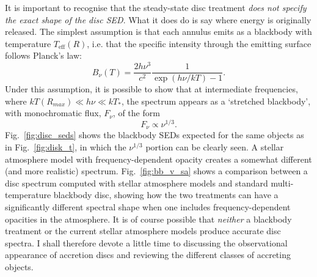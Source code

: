 It is important to recognise that the steady-state disc treatment
{\sl does not specify the exact shape of the disc SED}. What it does do is 
say where energy is originally released. The simplest assumption is
that each annulus emits as a blackbody with temperature 
$T_{\mathrm{eff}} (R)$, i.e. that the specific intensity through the emitting surface
follows Planck's law:
\begin{equation}
B_\nu (T) = \frac{2 h \nu^3}{c^2} \frac{1}{\exp(h\nu / kT) - 1}.
\label{eq:planck}
\end{equation}
Under this assumption, it is possible to show that at intermediate frequencies, 
where $kT(R_{max}) \ll h \nu \ll kT_*$,
the spectrum appears as a `stretched blackbody', with monochromatic flux, 
$F_\nu$, of the form 
\begin{equation}
F_{\nu} \propto \nu^{1/3}.
\end{equation}
Fig.~\ref{fig:disc_seds} shows the blackbody SEDs expected for the same 
objects as in Fig.~\ref{fig:disk_t}, in
which the $\nu^{1/3}$ portion can be clearly seen.
A stellar atmosphere model with frequency-dependent opacity creates a somewhat 
different (and more realistic) spectrum. 
Fig.~\ref{fig:bb_v_sa} shows a comparison between a disc spectrum computed with 
stellar atmosphere models and standard multi-temperature blackbody disc, showing how the two treatments
can have a significantly different spectral shape when one includes frequency-dependent opacities
in the atmosphere. It is of course possible that {\em neither} a blackbody treatment
or the current stellar atmosphere models produce accurate disc spectra. 
I shall therefore devote a little time to discussing
the observational appearance of accretion discs and reviewing
the different classes of accreting objects.


